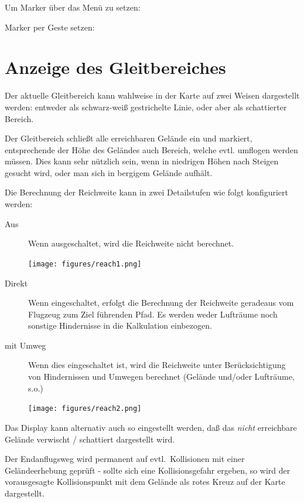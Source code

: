 Um Marker über das Menü zu setzen:
\begin{quote}
\blink{}
\end{quote}

Marker per Geste setzen: 

\section{Anzeige des Gleitbereiches}\label{sec:reach}

Der aktuelle Gleitbereich kann wahlweise in der Karte auf zwei Weisen dargestellt werden:
entweder als schwarz-weiß gestrichelte Linie, oder aber als schattierter Bereich.

Der Gleitbereich schließt alle erreichbaren Gelände ein und markiert, entsprechende der Höhe des Geländes auch Bereich, welche evtl. umflogen werden müssen.  Dies kann sehr nützlich sein, wenn in niedrigen Höhen nach Steigen gesucht wird, oder man sich in bergigem Gelände aufhält.

Die Berechnung der Reichweite kann in zwei Detailstufen  wie folgt konfiguriert werden:

\begin{description}
\item[Aus] Wenn ausgeschaltet, wird die Reichweite nicht berechnet.
\halt
\begin{center}
\texttt{[image: figures/reach1.png]}
\end{center}
\item[Direkt] Wenn eingeschaltet, erfolgt die Berechnung der Reichweite geradeaus vom Flugzeug zum Ziel führenden Pfad. Es werden weder Lufträume noch sonstige Hindernisse in die Kalkulation einbezogen.
 \item[mit Umweg] Wenn dies eingeschaltet ist, wird die Reichweite unter Berücksichtigung von Hindernissen und Umwegen berechnet (Gelände und/oder Lufträume, s.o.)
\begin{center}
\texttt{[image: figures/reach2.png]}
\end{center}
\end{description}

Das Display kann alternativ auch so eingestellt werden, daß das  \emph{nicht} erreichbare Gelände  verwischt / schattiert dargestellt wird.  

Der Endanflugsweg wird permanent auf evtl.\ Kollisionen mit einer Geländeerhebung geprüft - sollte sich eine Kollisionsgefahr ergeben, so wird der vorausgesagte Kollisionspunkt mit dem Gelände als rotes Kreuz auf der Karte dargestellt.

